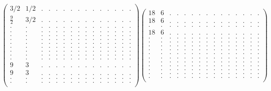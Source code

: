 \documentclass[12pt,a4paper]{amsart}
\begin{document}
\begin{align*}
\left(\begin{array}{rrrrrrrrrrrrrrr}%
3/2&1/2&.&.&.&.&.&.&.&.&.&.&.&.&.\\%
\frac{9}{2}&3/2&.&.&.&.&.&.&.&.&.&.&.&.&.\\%
.&.&.&.&.&.&.&.&.&.&.&.&.&.&.\\%
.&.&.&.&.&.&.&.&.&.&.&.&.&.&.\\%
.&.&.&.&.&.&.&.&.&.&.&.&.&.&.\\%
.&.&.&.&.&.&.&.&.&.&.&.&.&.&.\\%
.&.&.&.&.&.&.&.&.&.&.&.&.&.&.\\%
.&.&.&.&.&.&.&.&.&.&.&.&.&.&.\\%
.&.&.&.&.&.&.&.&.&.&.&.&.&.&.\\%
.&.&.&.&.&.&.&.&.&.&.&.&.&.&.\\%
.&.&.&.&.&.&.&.&.&.&.&.&.&.&.\\%
9&3&.&.&.&.&.&.&.&.&.&.&.&.&.\\%
9&3&.&.&.&.&.&.&.&.&.&.&.&.&.\\%
.&.&.&.&.&.&.&.&.&.&.&.&.&.&.\\%
.&.&.&.&.&.&.&.&.&.&.&.&.&.&.\\%
\end{array}\right)%
\left(\begin{array}{rrrrrrrrrrrrrrr}%
18&6&.&.&.&.&.&.&.&.&.&.&.&.&.\\%
18&6&.&.&.&.&.&.&.&.&.&.&.&.&.\\%
.&.&.&.&.&.&.&.&.&.&.&.&.&.&.\\%
18&6&.&.&.&.&.&.&.&.&.&.&.&.&.\\%
.&.&.&.&.&.&.&.&.&.&.&.&.&.&.\\%
.&.&.&.&.&.&.&.&.&.&.&.&.&.&.\\%
.&.&.&.&.&.&.&.&.&.&.&.&.&.&.\\%
.&.&.&.&.&.&.&.&.&.&.&.&.&.&.\\%
.&.&.&.&.&.&.&.&.&.&.&.&.&.&.\\%
.&.&.&.&.&.&.&.&.&.&.&.&.&.&.\\%
.&.&.&.&.&.&.&.&.&.&.&.&.&.&.\\%
.&.&.&.&.&.&.&.&.&.&.&.&.&.&.\\%
.&.&.&.&.&.&.&.&.&.&.&.&.&.&.\\%
.&.&.&.&.&.&.&.&.&.&.&.&.&.&.\\%
.&.&.&.&.&.&.&.&.&.&.&.&.&.&.\\%
\end{array}\right)%
\end{align*}
\end{document}
